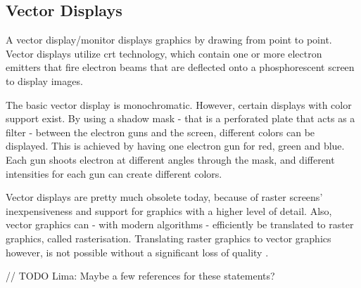 \subsection{Vector Displays}
A vector display/monitor displays graphics by drawing from point to point.
Vector displays utilize \gls{crt} technology, which contain one or more electron emitters that fire electron beams that are deflected onto a phosphorescent screen to display images.

The basic vector display is monochromatic.
However, certain displays with color support exist.
By using a shadow mask - that is a perforated plate that acts as a filter - between the electron guns and the screen, different colors can be displayed. This is achieved by having one electron gun for red, green and blue. Each gun shoots electron at different angles through the mask, and different intensities for each gun can create different colors.

Vector displays are pretty much obsolete today, because of raster screens' inexpensiveness and support for graphics with a higher level of detail.
Also, vector graphics can - with modern algorithms - efficiently be translated to raster graphics, called rasterisation.
Translating raster graphics to vector graphics however, is not possible without a significant loss of quality \cite{inverse-rasterisation}.

// TODO Lima: Maybe a few references for these statements?
